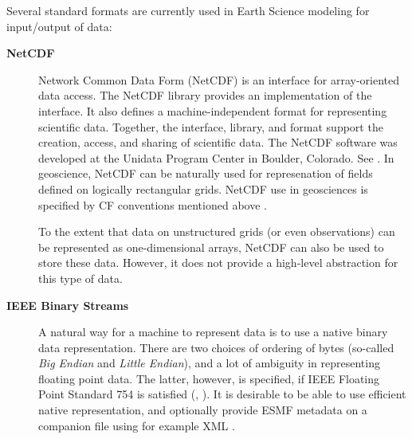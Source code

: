 Several standard formats are currently used in Earth Science modeling
for input/output of data:

\begin{description}
\item[\bf NetCDF] Network Common Data Form (NetCDF) is an interface for 
array-oriented data access. The NetCDF library provides an
implementation of the interface. It also defines a 
machine-independent format for representing scientific data. Together,
the interface, library, and format support the creation, access, and
sharing of scientific data. The NetCDF software was developed at the
Unidata Program Center in Boulder, Colorado. See \cite{NetCDF3_UsersGuide_C}.
In geoscience, NetCDF can be naturally used for represenation of fields 
defined on logically rectangular grids. NetCDF use in geosciences is 
specified by CF conventions mentioned above \cite{NetCDF_CF_v1_beta3}. 

To the extent that data on unstructured grids (or even observations) can be 
represented as one-dimensional arrays, NetCDF can also be used to store these 
data. However, it does not provide a high-level abstraction for this type of 
data. 

\item[\bf IEEE Binary Streams]
A natural way for a machine to represent data is to use a native
binary data representation. There are two choices of ordering of bytes
(so-called {\it Big Endian} and {\it Little Endian}), and a lot of
ambiguity in representing floating point data. The latter, however, is
specified, if IEEE Floating Point Standard 754 is satisfied
(\cite{IEEE-Floating-Point}, \cite{Kahan-IEEE-754}). It is desirable
to be able to use efficient native representation, and optionally
provide ESMF metadata on a companion file using for example XML
\cite{XML-W3C}.

\end{description}






